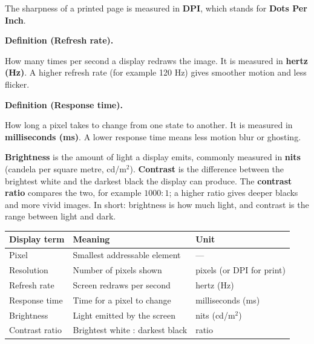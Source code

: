 \documentclass[11pt]{article}
\newenvironment{definitionbox}[1]{%
  \par\noindent\textbf{Definition (#1).}\ \itshape
}{\par\vspace{0.3em}}
\begin{document}
The sharpness of a printed page is measured in \textbf{DPI}, which stands for
\textbf{Dots Per Inch}.

\begin{definitionbox}{Refresh rate}
How many times per second a display redraws the image. It is measured in
\textbf{hertz (Hz)}. A higher refresh rate (for example 120 Hz) gives
smoother motion and less flicker.
\end{definitionbox}

\begin{definitionbox}{Response time}
How long a pixel takes to change from one state to another. It is measured
in \textbf{milliseconds (ms)}. A lower response time means less motion blur
or ghosting.
\end{definitionbox}

\textbf{Brightness} is the amount of light a display emits, commonly measured
in \textbf{nits} (candela per square metre, cd/m$^2$). \textbf{Contrast} is
the difference between the brightest white and the darkest black the display
can produce. The \textbf{contrast ratio} compares the two, for example
$1000:1$; a higher ratio gives deeper blacks and more vivid images. In short:
brightness is how much light, and contrast is the range between light and
dark.

\begin{center}
\begin{tabular}{lll}
\toprule
\textbf{Display term} & \textbf{Meaning} & \textbf{Unit} \\
\midrule
Pixel & Smallest addressable element & --- \\
Resolution & Number of pixels shown & pixels (or DPI for print) \\
Refresh rate & Screen redraws per second & hertz (Hz) \\
Response time & Time for a pixel to change & milliseconds (ms) \\
Brightness & Light emitted by the screen & nits (cd/m$^2$) \\
Contrast ratio & Brightest white : darkest black & ratio \\
\bottomrule
\end{tabular}
\end{center}
\end{document}

